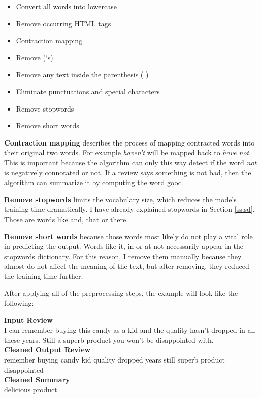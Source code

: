 \begin{tcolorbox}
	\begin{itemize}
		\item Convert all words into lowercase
		\item Remove occurring HTML tags
		\item Contraction mapping
		\item Remove (‘s)
		\item Remove any text inside the parenthesis ( )
		\item Eliminate punctuations and special characters
		\item Remove stopwords
		\item Remove short words
	\end{itemize}
\end{tcolorbox}

\textbf{Contraction mapping} describes the process of mapping contracted words into their original two words. For example \textit{haven't} will be mapped back to \textit{have not}. This is important because the algorithm can only this way detect if the word \textit{not} is negatively connotated or not. If a review says something is not bad, then the algorithm can summarize it by computing the word good. 

\textbf{Remove stopwords} limits the vocabulary size, which reduces the models training time dramatically. I have already explained stopwords in Section \ref{ss:sd}. Those are words like and, that or there. 

\textbf{Remove short words} because those words most likely do not play a vital role in predicting the output. Words like it, in or at not necessarily appear in the stopwords dictionary. For this reason, I remove them manually because they almost do not affect the meaning of the text, but after removing, they reduced the training time further. 

After applying all of the preprocessing steps, the example will look like the following:

\begin{tcolorbox}
	\textbf{Input Review} \\
	I can remember buying this candy as a kid and the quality hasn't dropped in all these years. Still a superb product you won't be disappointed with. \\
	
	\textbf{Cleaned Output Review} \\
	remember buying candy kid quality dropped years still superb product disappointed \\
	
	\textbf{Cleaned Summary} \\
	delicious product
\end{tcolorbox}

